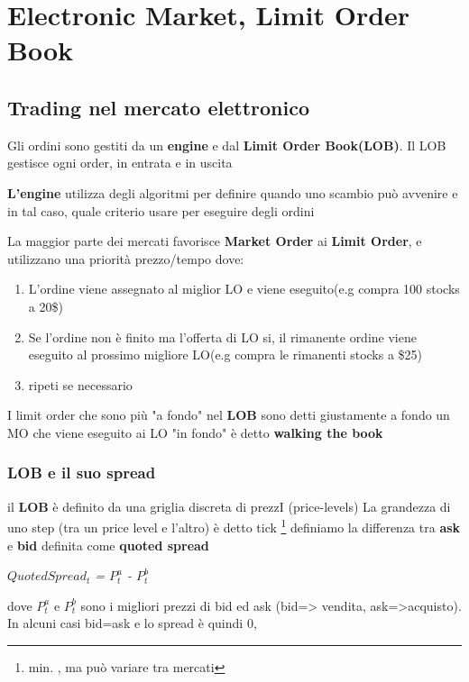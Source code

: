 \documentclass[a4paper,11pt]{report}
\begin{document}
{%


\chapter{Electronic Market, Limit Order Book}

\section{Trading nel mercato elettronico}
	Gli ordini sono gestiti da un \textbf{engine} e dal \textbf{Limit Order Book(LOB)}. \newline
	Il LOB gestisce ogni order, in entrata e in uscita

	\textbf{L'engine} utilizza degli algoritmi per definire quando uno scambio può avvenire e in tal caso, quale criterio usare per 		eseguire degli ordini

	La maggior parte dei mercati favorisce \textbf{Market Order} ai \textbf{Limit Order}, e utilizzano una priorità prezzo/tempo dove:
\begin{enumerate}
	\item L'ordine viene assegnato al miglior LO e viene eseguito(e.g compra 100 stocks a 20\$)
	\item Se l'ordine non è finito ma l'offerta di LO si, il rimanente ordine viene eseguito al prossimo migliore LO(e.g compra le rimanenti stocks a \$25)
	\item ripeti se necessario
\end{enumerate}
	I limit order che sono più "a fondo" nel \textbf{LOB} sono detti {\tiny{giustamente}} a fondo \newline
	un MO che viene eseguito ai LO "in fondo" è detto \textbf{walking the book}

\newpage 

\subsection{LOB e il suo spread}
	il \textbf{LOB} è definito da una griglia discreta di prezzI (price-levels) \newline
	La grandezza di uno step (tra un price level e l'altro) è detto tick \footnote{min. {}, ma può variare tra mercati} \newline
	definiamo la differenza tra \textbf{ask} e \textbf{bid} definita come \textbf{quoted spread}
\begin{center}
	\emph{$QuotedSpread_t$ = $P_t^a$ - $P_t^b$}
\end{center}
dove $P_t^a$ e $P_t^b$ sono i migliori prezzi di bid ed ask (bid=> vendita, ask=>acquisto).
	 \newline
	In alcuni casi bid=ask e lo spread è quindi 0,

}
\end{document}
